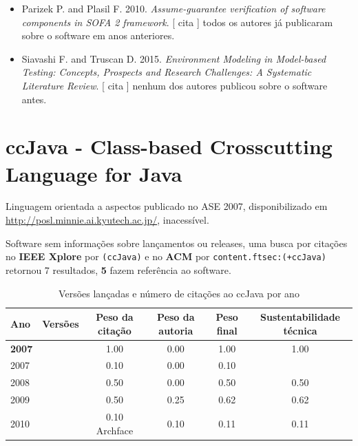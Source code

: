 \begin{itemize}
      [
          cita
          usa
          contribui
      ]
todos os autores já publicaram sobre o software em anos anteriores.
\item Parizek P. and Plasil F.
      2010.
        \textit{ Assume-guarantee verification of software components in SOFA 2 framework}.
      [
          cita
      ]
todos os autores já publicaram sobre o software em anos anteriores.
\item Siavashi F. and Truscan D.
      2015.
        \textit{ Environment Modeling in Model-based Testing: Concepts, Prospects and Research Challenges: A Systematic Literature Review}.
      [
          cita
      ]
nenhum dos autores publicou sobre o software antes.
\end{itemize}
\section{ccJava - Class-based Crosscutting Language for Java}

Linguagem orientada a aspectos
publicado no ASE 2007,
disponibilizado em \url{http://posl.minnie.ai.kyutech.ac.jp/},
inacessível.

Software sem informações sobre lançamentos ou releases,
uma busca por citações no {\bf IEEE Xplore} por
\texttt{(ccJava)}
e no {\bf ACM} por
\texttt{content.ftsec:(+ccJava)}
retornou
7 resultados,
{\bf 5} fazem referência ao software.


\begin{table}[H]
\caption{Versões lançadas e número de citações ao ccJava por ano}
\centering
\begin{tabular}{| l | c | c | c | c | c |}
  \hline
  Ano & Versões & Peso da citação & Peso da autoria & Peso final & Sustentabilidade técnica \\
  \hline
            {\bf 2007}
          &
          
          &
          1.00
          &
          0.00
          &
          1.00
          &
            {\color{blue} 1.00}
          \\
            2007
          &
          
          &
          0.10
          &
          0.00
          &
          0.10
          &
          \\
\hline
            2008
          &
          
          &
          0.50
          &
          0.00
          &
          0.50
          &
            {\color{blue} 0.50}
          \\
\hline
            2009
          &
          
          &
          0.50
          &
          0.25
          &
          0.62
          &
            {\color{blue} 0.62}
          \\
\hline
            2010
          &
          
          &
          0.10
            {\tiny Archface}
          &
          0.10
          &
          0.11
          &
            {\color{red} 0.11}
          \\
\hline
\end{tabular}
\end{table}

